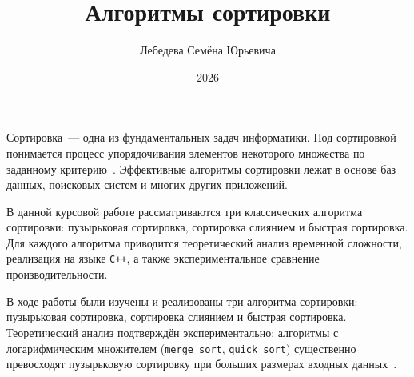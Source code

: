 \documentclass[coursework]{SCWorks}
\begin{document}

\title{Алгоритмы сортировки}




\author{Лебедева Семёна Юрьевича}






\date{2026}

\maketitle

\secNumbering

\tableofcontents

\intro

Сортировка~--- одна из фундаментальных задач информатики.
Под сортировкой понимается процесс упорядочивания элементов некоторого
множества по заданному критерию~\cite{Knuth}. Эффективные алгоритмы
сортировки лежат в основе баз данных, поисковых систем и многих других
приложений.

В данной курсовой работе рассматриваются три классических алгоритма
сортировки: пузырьковая сортировка, сортировка слиянием и быстрая
сортировка. Для каждого алгоритма приводится теоретический анализ
временной сложности, реализация на языке \texttt{C++}, а также
экспериментальное сравнение производительности.





\conclusion

В ходе работы были изучены и реализованы три алгоритма сортировки:
пузырьковая сортировка, сортировка слиянием и быстрая сортировка.
Теоретический анализ подтверждён экспериментально: алгоритмы с
логарифмическим множителем (\texttt{merge\_sort},
\texttt{quick\_sort}) существенно превосходят пузырьковую
сортировку при больших размерах входных данных~\cite{Cormen}.
\end{document}
